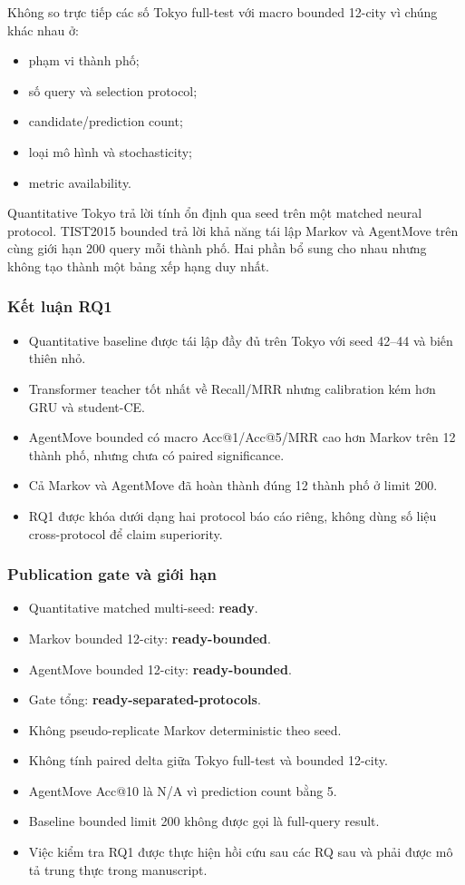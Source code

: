 Không so trực tiếp các số Tokyo full-test với macro bounded 12-city vì chúng khác nhau ở:

\begin{itemize}
\item phạm vi thành phố;
\item số query và selection protocol;
\item candidate/prediction count;
\item loại mô hình và stochasticity;
\item metric availability.
\end{itemize}

Quantitative Tokyo trả lời tính ổn định qua seed trên một matched neural protocol. TIST2015 bounded trả lời khả năng tái lập Markov và AgentMove trên cùng giới hạn 200 query mỗi thành phố. Hai phần bổ sung cho nhau nhưng không tạo thành một bảng xếp hạng duy nhất.

\subsubsection*{Kết luận RQ1}

\begin{itemize}
\item Quantitative baseline được tái lập đầy đủ trên Tokyo với seed 42--44 và biến thiên nhỏ.
\item Transformer teacher tốt nhất về Recall/MRR nhưng calibration kém hơn GRU và student-CE.
\item AgentMove bounded có macro Acc@1/Acc@5/MRR cao hơn Markov trên 12 thành phố, nhưng chưa có paired significance.
\item Cả Markov và AgentMove đã hoàn thành đúng 12 thành phố ở limit 200.
\item RQ1 được khóa dưới dạng hai protocol báo cáo riêng, không dùng số liệu cross-protocol để claim superiority.
\end{itemize}

\subsubsection*{Publication gate và giới hạn}

\begin{itemize}
\item Quantitative matched multi-seed: \textbf{ready}.
\item Markov bounded 12-city: \textbf{ready-bounded}.
\item AgentMove bounded 12-city: \textbf{ready-bounded}.
\item Gate tổng: \textbf{ready-separated-protocols}.
\item Không pseudo-replicate Markov deterministic theo seed.
\item Không tính paired delta giữa Tokyo full-test và bounded 12-city.
\item AgentMove Acc@10 là N/A vì prediction count bằng 5.
\item Baseline bounded limit 200 không được gọi là full-query result.
\item Việc kiểm tra RQ1 được thực hiện hồi cứu sau các RQ sau và phải được mô tả trung thực trong manuscript.
\end{itemize}

